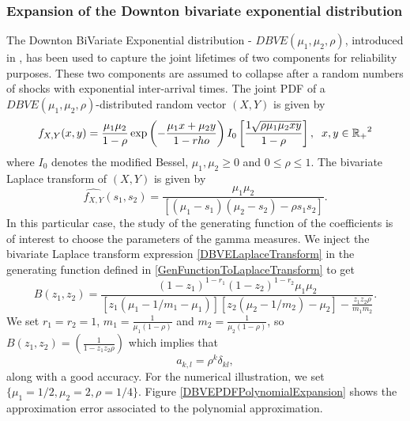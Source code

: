 \subsubsection{Expansion of the Downton bivariate exponential distribution}
The Downton BiVariate Exponential distribution - $DBVE(\mu_{1},\mu_{2},\rho)$, introduced in \citet{Do70}, has been used to capture the joint lifetimes of two components for reliability purposes. These two components are assumed to collapse after a random numbers of shocks with exponential inter-arrival times. The joint PDF of a $DBVE(\mu_{1},\mu_{2},\rho)$-distributed random vector $(X,Y)$ is given by
\begin{equation}\label{DBVEPDF}
f_{X,Y}(x,y)=\frac{\mu_{1}\mu_{2}}{1-\rho}\exp\left(-\frac{\mu_{1}x+\mu_{2}y}{1-rho}\right)I_{0}\left[\frac{1\sqrt{\rho\mu_{1}\mu_{2}xy}}{1-\rho}\right],\hspace{0.2cm}x,y\in\mathbb{R_{+}}^{2}
\end{equation}
where $I_{0}$ denotes the modified Bessel, $\mu_{1},\mu_{2}\geq0$ and $0\leq\rho\leq 1$. The bivariate Laplace transform of $(X,Y)$ is given by
\begin{equation}\label{DBVELaplaceTransform}
\widehat{f_{X,Y}}(s_{1},s_{2})=\frac{\mu_{1}\mu_{2}}{\left[(\mu_{1}-s_{1})(\mu_{2}-s_{2})-\rho s_{1}s_{2}\right]}.
\end{equation}
In this particular case, the study of the generating function of the coefficients is of interest to choose the parameters of the gamma measures. We inject the bivariate Laplace transform expression \eqref{DBVELaplaceTransform} in the generating function defined in \eqref{GenFunctionToLaplaceTransform} to get
\begin{equation}\label{CoefficientGeneratingFunctionDBVE}
B(z_{1},z_{2})=\frac{(1-z_{1})^{1-r_{1}}(1-z_{2})^{1-r_{2}}\mu_{1}\mu_{2}}{\left[z_{1}(\mu_{1}-1/m_{1}-\mu_{1})\right]\left[z_{2}(\mu_{2}-1/m_{2})-\mu_{2}\right]-\frac{z_{1}z_{2}\rho}{m_{1}m_{2}}}.
\end{equation}
We set $r_{1}=r_{2}=1$, $m_{1}=\frac{1}{\mu_{1}(1-\rho)}$ and $m_{2}=\frac{1}{\mu_{2}(1-\rho)}$, so $B(z_{1},z_{2})=\left(\frac{1}{1-z_{1}z_{2}\rho}\right)$ which implies that
 \begin{equation}
a_{k,l}=\rho^{k}\delta_{kl},
\end{equation}  
along with a good accuracy. For the numerical illustration, we set $\{\mu_{1}=1/2,\mu_{2}=2,\rho=1/4\}$. Figure \ref{DBVEPDFPolynomialExpansion} shows the approximation error associated to the polynomial approximation. 
